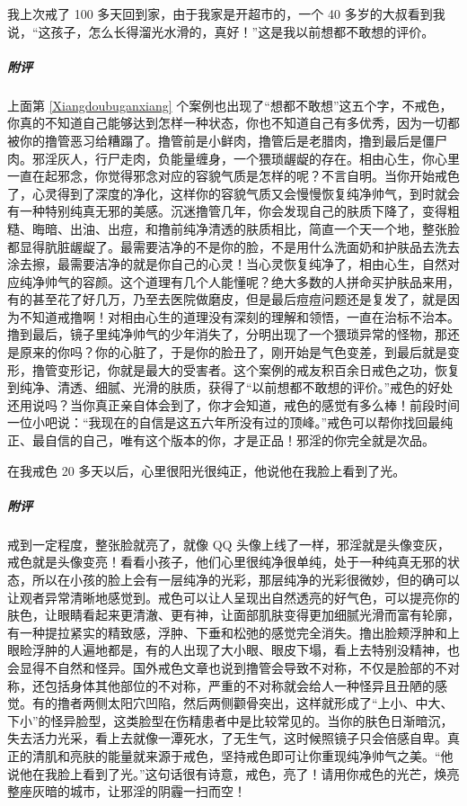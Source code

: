 \begin{case}
    我上次戒了 100 多天回到家，由于我家是开超市的，一个 40 多岁的大叔看到我说，“这孩子，怎么长得溜光水滑的，真好！”这是我以前想都不敢想的评价。
    \subparagraph{附评} 上面第 \ref{Xiangdoubuganxiang} 个案例也出现了“想都不敢想”这五个字，不戒色，你真的不知道自己能够达到怎样一种状态，你也不知道自己有多优秀，因为一切都被你的撸管恶习给糟蹋了。撸管前是小鲜肉，撸管后是老腊肉，撸到最后是僵尸肉。邪淫灰人，行尸走肉，负能量缠身，一个猥琐龌龊的存在。相由心生，你心里一直在起邪念，你觉得邪念对应的容貌气质是怎样的呢？不言自明。当你开始戒色了，心灵得到了深度的净化，这样你的容貌气质又会慢慢恢复纯净帅气，到时就会有一种特别纯真无邪的美感。沉迷撸管几年，你会发现自己的肤质下降了，变得粗糙、晦暗、出油、出痘，和撸前纯净清透的肤质相比，简直一个天一个地，整张脸都显得肮脏龌龊了。最需要洁净的不是你的脸，不是用什么洗面奶和护肤品去洗去涂去擦，最需要洁净的就是你自己的心灵！当心灵恢复纯净了，相由心生，自然对应纯净帅气的容颜。这个道理有几个人能懂呢？绝大多数的人拼命买护肤品来用，有的甚至花了好几万，乃至去医院做磨皮，但是最后痘痘问题还是复发了，就是因为不知道戒撸啊！对相由心生的道理没有深刻的理解和领悟，一直在治标不治本。撸到最后，镜子里纯净帅气的少年消失了，分明出现了一个猥琐异常的怪物，那还是原来的你吗？你的心脏了，于是你的脸丑了，刚开始是气色变差，到最后就是变形，撸管变形记，你就是最大的受害者。这个案例的戒友积百余日戒色之功，恢复到纯净、清透、细腻、光滑的肤质，获得了“以前想都不敢想的评价。”戒色的好处还用说吗？当你真正亲自体会到了，你才会知道，戒色的感觉有多么棒！前段时间一位小吧说：“我现在的自信是这五六年所没有过的顶峰。”戒色可以帮你找回最纯正、最自信的自己，唯有这个版本的你，才是正品！邪淫的你完全就是次品。
\end{case}

\begin{case}
    在我戒色 20 多天以后，心里很阳光很纯正，他说他在我脸上看到了光。
    \subparagraph{附评} 戒到一定程度，整张脸就亮了，就像 QQ 头像上线了一样，邪淫就是头像变灰，戒色就是头像变亮！看看小孩子，他们心里很纯净很单纯，处于一种纯真无邪的状态，所以在小孩的脸上会有一层纯净的光彩，那层纯净的光彩很微妙，但的确可以让观者异常清晰地感觉到。戒色可以让人呈现出自然透亮的好气色，可以提亮你的肤色，让眼睛看起来更清澈、更有神，让面部肌肤变得更加细腻光滑而富有轮廓，有一种提拉紧实的精致感，浮肿、下垂和松弛的感觉完全消失。撸出脸颊浮肿和上眼睑浮肿的人遍地都是，有的人出现了大小眼、眼皮下塌，看上去特别没精神，也会显得不自然和怪异。国外戒色文章也说到撸管会导致不对称，不仅是脸部的不对称，还包括身体其他部位的不对称，严重的不对称就会给人一种怪异且丑陋的感觉。有的撸者两侧太阳穴凹陷，然后两侧颧骨突出，这样就形成了“上小、中大、下小”的怪异脸型，这类脸型在伤精患者中是比较常见的。当你的肤色日渐暗沉，失去活力光采，看上去就像一潭死水，了无生气，这时候照镜子只会倍感自卑。真正的清肌和亮肤的能量就来源于戒色，坚持戒色即可让你重现纯净帅气之美。“他说他在我脸上看到了光。”这句话很有诗意，戒色，亮了！请用你戒色的光芒，焕亮整座灰暗的城市，让邪淫的阴霾一扫而空！
\end{case}

